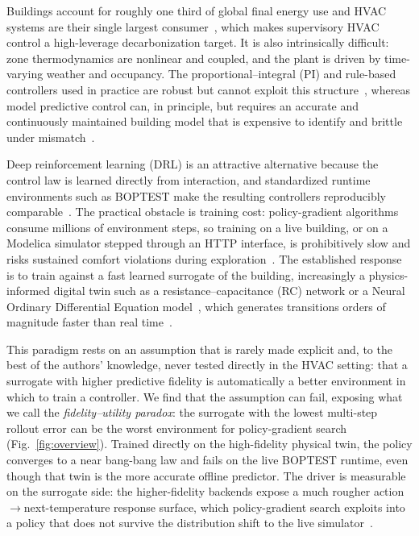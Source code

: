 \documentclass[5p]{elsarticle}
\begin{document}
Buildings account for roughly one third of global final energy use and HVAC systems are their
single largest consumer~\cite{AlSayed2024Review,Nguyen2024Modelling}, which makes supervisory HVAC
control a high-leverage decarbonization target. It is also intrinsically difficult: zone
thermodynamics are nonlinear and coupled, and the plant is driven by time-varying weather and
occupancy. The proportional--integral (PI) and rule-based controllers used in practice are robust
but cannot exploit this structure~\cite{Savino2025ASHRAE,Gao2024Predictive}, whereas model
predictive control can, in principle, but requires an accurate and continuously maintained building
model that is expensive to identify and brittle under mismatch~\cite{Hou2024MultiSource}.

Deep reinforcement learning (DRL) is an attractive alternative because the control law is learned
directly from interaction, and standardized runtime environments such as BOPTEST make the resulting
controllers reproducibly comparable~\cite{Blum2021BOPTEST,Wetter2014Modelica,Arroyo2021GymBOPTEST}.
The practical obstacle is training cost: policy-gradient algorithms consume millions of environment
steps, so training on a live building, or on a Modelica simulator stepped through an HTTP
interface, is prohibitively slow and risks sustained comfort violations during
exploration~\cite{Wang2025SafeDRL}. The established response is to train against a fast learned
surrogate of the building, increasingly a physics-informed digital twin such as a
resistance--capacitance (RC) network or a Neural Ordinary Differential Equation
model~\cite{Bacher2011RCIdentification,Chen2018NeuralODE,Raissi2019PINN,Hedayat2025PINN}, which
generates transitions orders of magnitude faster than real
time~\cite{HouEvins2024,Mshragi2026FastML}.

This paradigm rests on an assumption that is rarely made explicit and, to the best of the authors'
knowledge, never tested directly in the HVAC setting: that a surrogate with higher predictive
fidelity is automatically a better environment in which to train a controller. We find that the
assumption can fail, exposing what we call the \emph{fidelity--utility paradox}: the surrogate with
the lowest multi-step rollout error can be the worst environment for policy-gradient search
(Fig.~\ref{fig:overview}). Trained directly on the high-fidelity physical twin, the policy
converges to a near bang-bang law and fails on the live BOPTEST runtime, even though that twin is
the more accurate offline predictor. The driver is measurable on the surrogate side: the
higher-fidelity backends expose a much rougher action$\to$next-temperature response surface, which
policy-gradient search exploits into a policy that does not survive the distribution shift to the
live simulator~\cite{RiahiSamani2026OOD}.
\end{document}

